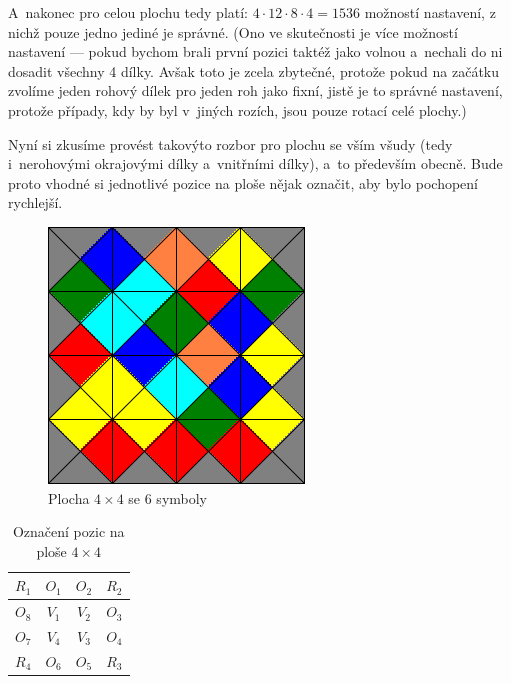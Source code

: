 \documentclass[11pt, titlepage]{report}
\begin{document}
A~nakonec pro celou plochu tedy platí: $4 \cdot 12 \cdot 8 \cdot 4 = 1536$ možností nastavení, z nichž pouze jedno jediné je správné. (Ono ve skutečnosti je více možností nastavení --- pokud bychom brali první pozici taktéž jako volnou a~nechali do ni dosadit všechny 4 dílky. Avšak toto je zcela zbytečné, protože pokud na začátku zvolíme jeden rohový dílek pro jeden roh jako fixní, jistě je to správné nastavení, protože případy, kdy by byl v~jiných rozích, jsou pouze rotací celé plochy.)

Nyní si zkusíme provést takovýto rozbor pro plochu se vším všudy (tedy i~nerohovými okrajovými dílky a~vnitřními dílky), a~to především obecně. Bude proto vhodné si jednotlivé pozice na ploše nějak označit, aby bylo pochopení rychlejší.

\begin{figure}[ht]
\centering
\includegraphics[scale=0.5]{4x4x6.png}
\caption{Plocha $4 \times 4$ se 6 symboly}
\end{figure}

\newpage
\begin{table}[ht]
\centering
\begin{tabular}{|c|c|c|c|}
\hline
$R_1$ & $O_1$ & $O_2$ & $R_2$ \\ \hline
$O_8$ & $V_1$ & $V_2$ & $O_3$ \\ \hline
$O_7$ & $V_4$ & $V_3$ & $O_4$ \\ \hline
$R_4$ & $O_6$ & $O_5$ & $R_3$ \\
\hline
\end{tabular}
\caption{Označení pozic na ploše $4 \times 4$}
\end{table}
\end{document}
